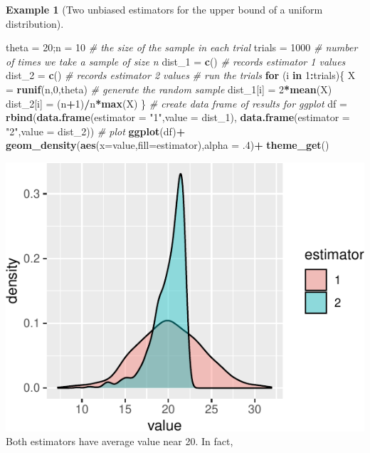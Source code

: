 \documentclass[
]{book}
\newenvironment{Shaded}{\begin{snugshade}}{\end{snugshade}}
\newcommand{\AttributeTok}[1]{\textcolor[rgb]{0.13,0.29,0.53}{#1}}
\newcommand{\CommentTok}[1]{\textcolor[rgb]{0.56,0.35,0.01}{\textit{#1}}}
\newcommand{\ControlFlowTok}[1]{\textcolor[rgb]{0.13,0.29,0.53}{\textbf{#1}}}
\newcommand{\DecValTok}[1]{\textcolor[rgb]{0.00,0.00,0.81}{#1}}
\newcommand{\FunctionTok}[1]{\textcolor[rgb]{0.13,0.29,0.53}{\textbf{#1}}}
\newcommand{\NormalTok}[1]{#1}
\newcommand{\OtherTok}[1]{\textcolor[rgb]{0.56,0.35,0.01}{#1}}
\newcommand{\SpecialCharTok}[1]{\textcolor[rgb]{0.81,0.36,0.00}{\textbf{#1}}}
\newcommand{\StringTok}[1]{\textcolor[rgb]{0.31,0.60,0.02}{#1}}
\theoremstyle{definition}
\theoremstyle{definition}
\newtheorem{example}{Example}[chapter]
\theoremstyle{definition}
\theoremstyle{definition}
\theoremstyle{remark}
\begin{document}
\begin{example}[Two unbiased estimators for the upper bound of a uniform distribution]
\begin{Shaded}
\begin{Highlighting}[]
\NormalTok{theta }\OtherTok{=} \DecValTok{20}\NormalTok{;n }\OtherTok{=} \DecValTok{10} \CommentTok{\# the size of the sample in each trial}
\NormalTok{trials }\OtherTok{=} \DecValTok{1000} \CommentTok{\# number of times we take a sample of size n}
\NormalTok{dist\_1 }\OtherTok{=} \FunctionTok{c}\NormalTok{() }\CommentTok{\# records estimator 1 values}
\NormalTok{dist\_2 }\OtherTok{=} \FunctionTok{c}\NormalTok{() }\CommentTok{\# records estimator 2 values}
\CommentTok{\# run the trials}
\ControlFlowTok{for}\NormalTok{ (i }\ControlFlowTok{in} \DecValTok{1}\SpecialCharTok{:}\NormalTok{trials)\{}
\NormalTok{  X }\OtherTok{=} \FunctionTok{runif}\NormalTok{(n,}\DecValTok{0}\NormalTok{,theta) }\CommentTok{\# generate the random sample}
\NormalTok{  dist\_1[i] }\OtherTok{=} \DecValTok{2}\SpecialCharTok{*}\FunctionTok{mean}\NormalTok{(X)}
\NormalTok{  dist\_2[i] }\OtherTok{=}\NormalTok{ (n}\SpecialCharTok{+}\DecValTok{1}\NormalTok{)}\SpecialCharTok{/}\NormalTok{n}\SpecialCharTok{*}\FunctionTok{max}\NormalTok{(X)}
\NormalTok{\}}
\CommentTok{\# create data frame of results for ggplot}
\NormalTok{df }\OtherTok{=} \FunctionTok{rbind}\NormalTok{(}\FunctionTok{data.frame}\NormalTok{(}\AttributeTok{estimator =} \StringTok{"1"}\NormalTok{,}\AttributeTok{value =}\NormalTok{ dist\_1),}
           \FunctionTok{data.frame}\NormalTok{(}\AttributeTok{estimator =} \StringTok{"2"}\NormalTok{,}\AttributeTok{value =}\NormalTok{ dist\_2))}
\CommentTok{\# plot}
\FunctionTok{ggplot}\NormalTok{(df)}\SpecialCharTok{+}
  \FunctionTok{geom\_density}\NormalTok{(}\FunctionTok{aes}\NormalTok{(}\AttributeTok{x=}\NormalTok{value,}\AttributeTok{fill=}\NormalTok{estimator),}\AttributeTok{alpha =}\NormalTok{ .}\DecValTok{4}\NormalTok{)}\SpecialCharTok{+}
  \FunctionTok{theme\_get}\NormalTok{()}
\end{Highlighting}
\end{Shaded}

\includegraphics{math340-notes_files/figure-latex/unnamed-chunk-40-1.pdf}
Both estimators have average value near 20. In fact,


\end{example}
\end{document}
